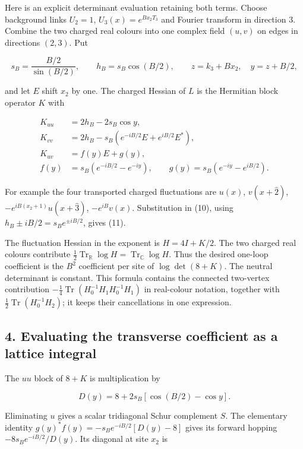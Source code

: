 \documentclass[11pt,a4paper]{article}
\begin{document}
Here is an explicit determinant evaluation retaining both terms. Choose
background links \(U_2=1\), \(U_3(x)=e^{Bx_2T_3}\) and Fourier transform
in direction 3. Combine the two charged real colours into one complex
field \((u,v)\) on edges in directions \((2,3)\). Put

\[s_B=\frac{B/2}{\sin(B/2)},\qquad h_B=s_B\cos(B/2),\qquad
z=k_3+Bx_2,\quad y=z+B/2,\]

and let \(E\) shift \(x_2\) by one. The charged Hessian of \(L\) is the
Hermitian block operator \(K\) with

\[\begin{aligned}
K_{uu}&=2h_B-2s_B\cos y,\\
K_{vv}&=2h_B-s_B(e^{-iB/2}E+e^{iB/2}E^*),\\
K_{uv}&=f(y)E+g(y),\\
f(y)&=s_B(e^{-iB/2}-e^{-iy}),\qquad
 g(y)=s_B(e^{-iy}-e^{iB/2}).
\end{aligned}\tag{11}\]

For example the four transported charged fluctuations are \(u(x)\),
\(v(x+\hat2)\), \(-e^{iB(x_2+1)}u(x+\hat3)\), \(-e^{iB}v(x)\).
Substitution in (10), using \(h_B\pm iB/2=s_Be^{\pm iB/2}\), gives (11).

The fluctuation Hessian in the exponent is \(H=4I+K/2\). The two charged
real colours contribute
\(\tfrac12\operatorname{Tr}_{\mathbb R}\log H =\operatorname{Tr}_{\mathbb C}\log H\).
Thus the desired one-loop coefficient is the \(B^2\) coefficient per
site of \(\log\det(8+K)\). The neutral determinant is constant. This
formula contains the connected two-vertex contribution
\(-\tfrac14\operatorname{Tr}(H_0^{-1}H_1H_0^{-1}H_1)\) in real-colour
notation, together with \(\tfrac12\operatorname{Tr}(H_0^{-1}H_2)\); it
keeps their cancellations in one expression.

\hypertarget{evaluating-the-transverse-coefficient-as-a-lattice-integral}{%
\subsection{4. Evaluating the transverse coefficient as a lattice
integral}\label{evaluating-the-transverse-coefficient-as-a-lattice-integral}}

The \(uu\) block of \(8+K\) is multiplication by

\[D(y)=8+2s_B[\cos(B/2)-\cos y].\]

Eliminating \(u\) gives a scalar tridiagonal Schur complement \(S\). The
elementary identity \(g(y)^*f(y)=-s_Be^{-iB/2}[D(y)-8]\) gives its
forward hopping \(-8s_Be^{-iB/2}/D(y)\). Its diagonal at site \(x_2\) is
\end{document}
